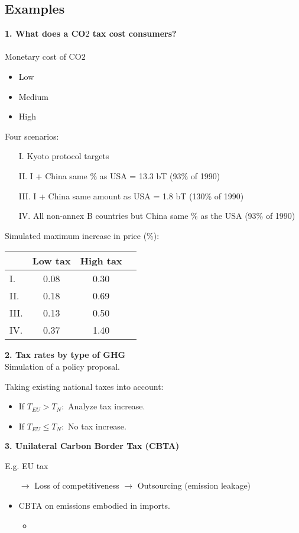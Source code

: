 \begin{multicols}{2}
\subsection{Examples}
\textbf{1. What does a CO$2$ tax cost consumers?}
\\ \\
Monetary cost of CO$2$
\begin{itemize}
  \item Low
  \item Medium
  \item High
\end{itemize}
Four scenarios:
\begin{itemize}
  \item[I.] Kyoto protocol targets
  \item[II.] I + China same \% as USA = 13.3 bT (93\% of 1990)
  \item[III.] I + China same amount as USA = 1.8 bT (130\% of 1990)
  \item[IV.] All non-annex B countries but China same \% as the USA (93\% of 1990)
\end{itemize}
Simulated maximum increase in price (\%):
\begin{center}
  \begin{tabular}{l|ccc}
  {}  & Low tax   & High tax  \\
  \midrule
  I.  & 0.08          & 0.30           \\
  II. & 0.18          & 0.69          \\
  III.& 0.13          & 0.50          \\
  IV. & 0.37          & 1.40
  \end{tabular}
\end{center}
\textbf{2. Tax rates by type of GHG}\\
Simulation of a policy proposal.\par
Taking existing national taxes into account:
\begin{itemize}
  \item If $T_{EU}>T_N:$ Analyze tax increase.
  \item If $T_{EU}\leq T_N:$ No tax increase.
\end{itemize}

\textbf{3. Unilateral Carbon Border Tax (CBTA)}\par
E.g. EU tax
\begin{itemize}
  \item[$\rightarrow$] Loss of competitiveness $\rightarrow$ Outsourcing (emission leakage)
  \item CBTA on emissions embodied in imports.
  \begin{itemize}
    \item
  \end{itemize}
\end{itemize}


\end{multicols}
